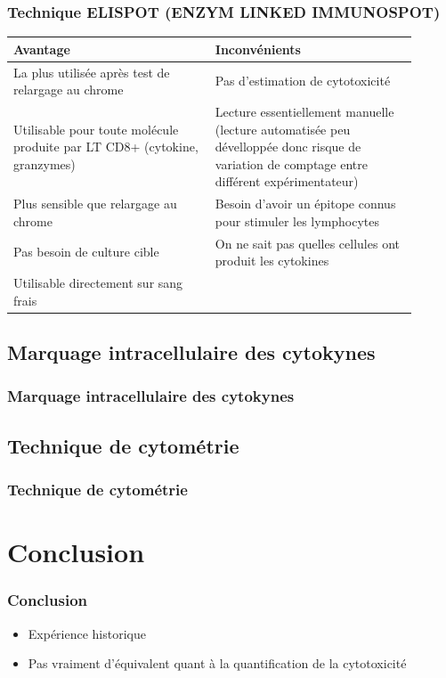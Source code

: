 \documentclass[12pt]{beamer}
\begin{document}
\begin{frame}
	\transuncover
	\frametitle{Technique ELISPOT (ENZYM LINKED IMMUNOSPOT)}
	{\footnotesize
	\begin{tabular}{|p{0.45\linewidth}|p{0.45\linewidth}|}
		\hline
	Avantage & Inconvénients\\ 
	\hline
	\hline
	La plus utilisée après test de relargage au chrome & Pas d’estimation de cytotoxicité \\ 
	Utilisable pour toute molécule produite par LT CD8+ (cytokine, granzymes) &  Lecture essentiellement manuelle (lecture automatisée peu dévelloppée donc risque de variation de comptage entre différent expérimentateur)\\ 
	Plus sensible que relargage au chrome & Besoin d'avoir un épitope connus pour stimuler les lymphocytes \\ 
	Pas besoin de culture cible & On ne sait pas quelles cellules ont produit les cytokines \\ 
	Utilisable directement sur sang frais &  \\ 
	\hline
	\end{tabular} 
	}
\end{frame}

\subsection{Marquage intracellulaire des cytokynes}

\begin{frame}
  \transuncover
  \frametitle{Marquage intracellulaire des cytokynes}

\end{frame}

\subsection{Technique de cytométrie}

\begin{frame}
  \transuncover
  \frametitle{Technique de cytométrie}


\end{frame}

\section{Conclusion}

\begin{frame}
  \transuncover
  \frametitle{Conclusion}

  \begin{itemize}
  \item Expérience historique
  \item Pas vraiment d'équivalent quant à la quantification de la cytotoxicité
  \end{itemize}

\end{frame}
\end{document}
